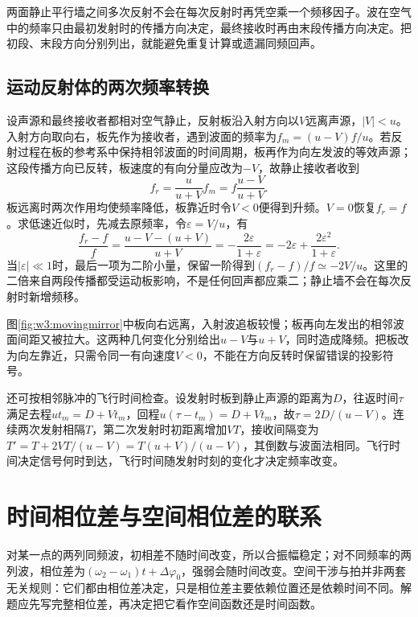 两面静止平行墙之间多次反射不会在每次反射时再凭空乘一个频移因子。波在空气中的频率只由最初发射时的传播方向决定，最终接收时再由末段传播方向决定。把初段、末段方向分别列出，就能避免重复计算或遗漏同频回声。

\subsection{运动反射体的两次频率转换}
设声源和最终接收者都相对空气静止，反射板沿入射方向以$V$远离声源，$|V|<u$。入射方向取向右，板先作为接收者，遇到波面的频率为$f_m=(u-V)f/u$。若反射过程在板的参考系中保持相邻波面的时间周期，板再作为向左发波的等效声源；这段传播方向已反转，板速度的有向分量应改为$-V$，故静止接收者收到
\[
f_r=\frac{u}{u+V}f_m
=f\frac{u-V}{u+V}.
\]
板远离时两次作用均使频率降低，板靠近时令$V<0$便得到升频。$V=0$恢复$f_r=f$。求低速近似时，先减去原频率，令$\varepsilon=V/u$，有
\[
\frac{f_r-f}{f}
=\frac{u-V-(u+V)}{u+V}
=-\frac{2\varepsilon}{1+\varepsilon}
=-2\varepsilon+\frac{2\varepsilon^2}{1+\varepsilon}.
\]
当$|\varepsilon|\ll1$时，最后一项为二阶小量，保留一阶得到$(f_r-f)/f\simeq-2V/u$。这里的二倍来自两段传播都受运动板影响，不是任何回声都应乘二；静止墙不会在每次反射时新增频移。

图\ref{fig:w3:movingmirror}中板向右远离，入射波追板较慢；板再向左发出的相邻波面间距又被拉大。这两种几何变化分别给出$u-V$与$u+V$，同时造成降频。把板改为向左靠近，只需令同一有向速度$V<0$，不能在方向反转时保留错误的投影符号。


还可按相邻脉冲的飞行时间检查。设发射时板到静止声源的距离为$D$，往返时间$\tau$满足去程$ut_m=D+Vt_m$，回程$u(\tau-t_m)=D+Vt_m$，故$\tau=2D/(u-V)$。连续两次发射相隔$T$，第二次发射时初距离增加$VT$，接收间隔变为$T'=T+2VT/(u-V)=T(u+V)/(u-V)$，其倒数与波面法相同。飞行时间决定信号何时到达，飞行时间随发射时刻的变化才决定频率改变。


\section{时间相位差与空间相位差的联系}
对某一点的两列同频波，初相差不随时间改变，所以合振幅稳定；对不同频率的两列波，相位差为$(\omega_2-\omega_1)t+\Delta\varphi_0$，强弱会随时间改变。空间干涉与拍并非两套无关规则：它们都由相位差决定，只是相位差主要依赖位置还是依赖时间不同。解题应先写完整相位差，再决定把它看作空间函数还是时间函数。

